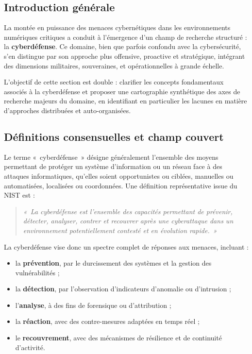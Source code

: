 \documentclass[ twoside,openright,titlepage,numbers=noenddot,headinclude,%
                footinclude=true,cleardoublepage=empty,abstractoff, %
                BCOR=5mm,paper=a4,fontsize=11pt,%
                french,american,%
                ]{scrreprt}
\begin{document}
\subsection*{Introduction générale}

La montée en puissance des menaces cybernétiques dans les environnements numériques critiques a conduit à l’émergence d’un champ de recherche structuré : la \textbf{cyberdéfense}. Ce domaine, bien que parfois confondu avec la cybersécurité, s’en distingue par son approche plus offensive, proactive et stratégique, intégrant des dimensions militaires, souveraines, et opérationnelles à grande échelle.

L’objectif de cette section est double : clarifier les concepts fondamentaux associés à la cyberdéfense et proposer une cartographie synthétique des axes de recherche majeurs du domaine, en identifiant en particulier les lacunes en matière d’approches distribuées et auto-organisées.

\vspace{0.5em}
\subsection*{Définitions consensuelles et champ couvert}

Le terme «~cyberdéfense~» désigne généralement l’ensemble des moyens permettant de protéger un système d’information ou un réseau face à des attaques informatiques, qu’elles soient opportunistes ou ciblées, manuelles ou automatisées, localisées ou coordonnées. Une définition représentative issue du NIST est :

\begin{quote}
    \textit{«~La cyberdéfense est l’ensemble des capacités permettant de prévenir, détecter, analyser, contrer et recouvrer après une cyberattaque dans un environnement potentiellement contesté et en évolution rapide.~»}
\end{quote}

La cyberdéfense vise donc un spectre complet de réponses aux menaces, incluant :
\begin{itemize}
    \item la \textbf{prévention}, par le durcissement des systèmes et la gestion des vulnérabilités ;
    \item la \textbf{détection}, par l’observation d’indicateurs d’anomalie ou d’intrusion ;
    \item l’\textbf{analyse}, à des fins de forensique ou d’attribution ;
    \item la \textbf{réaction}, avec des contre-mesures adaptées en temps réel ;
    \item le \textbf{recouvrement}, avec des mécanismes de résilience et de continuité d’activité.
\end{itemize}
\end{document}
